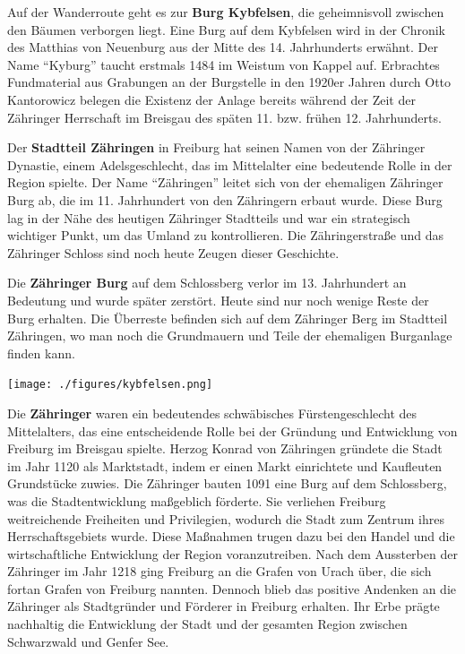 \documentclass[landscape, a4paper]{article}
\newcommand\alert[1]{\textcolor{PrimaryColor}{\textbf{#1}}}
\begin{document}
\begin{minipage}[t]{0.32\textwidth}
	\setlength{\parskip}{0.25cm}
	\vspace{0cm}

	Auf der Wanderroute geht es zur \alert{Burg Kybfelsen}, die geheimnisvoll zwischen den Bäumen verborgen liegt. Eine Burg auf dem Kybfelsen wird in der Chronik des Matthias von Neuenburg aus der Mitte des 14. Jahrhunderts erwähnt. Der Name \enquote{Kyburg} taucht erstmals 1484 im Weistum von Kappel auf. Erbrachtes Fundmaterial aus Grabungen an der Burgstelle in den 1920er Jahren durch Otto Kantorowicz belegen die Existenz der Anlage bereits während der Zeit der Zähringer Herrschaft im Breisgau des späten 11. bzw. frühen 12. Jahrhunderts. %

	Der \alert{Stadtteil Zähringen} in Freiburg hat seinen Namen von der Zähringer Dynastie, einem Adelsgeschlecht, das im Mittelalter eine bedeutende Rolle in der Region spielte. Der Name \enquote{Zähringen} leitet sich von der ehemaligen Zähringer Burg ab, die im 11. Jahrhundert von den Zähringern erbaut wurde. Diese Burg lag in der Nähe des heutigen Zähringer Stadtteils und war ein strategisch wichtiger Punkt, um das Umland zu kontrollieren. Die Zähringerstraße und das Zähringer Schloss sind noch heute Zeugen dieser Geschichte.

	Die \alert{Zähringer Burg} auf dem Schlossberg verlor im 13. Jahrhundert an Bedeutung und wurde später zerstört. Heute sind nur noch wenige Reste der Burg erhalten. Die Überreste befinden sich auf dem Zähringer Berg im Stadtteil Zähringen, wo man noch die Grundmauern und Teile der ehemaligen Burganlage finden kann.

	\texttt{[image: ./figures/kybfelsen.png]}
	\setlength{\parskip}{0.25cm}
	\vspace{0.15cm}

	Die \alert{Zähringer} waren ein bedeutendes schwäbisches Fürstengeschlecht des Mittelalters, das eine entscheidende Rolle bei der Gründung und Entwicklung von Freiburg im Breisgau spielte. Herzog Konrad von Zähringen gründete die Stadt im Jahr 1120 als Marktstadt, indem er einen Markt einrichtete und Kaufleuten Grundstücke zuwies. Die Zähringer bauten 1091 eine Burg auf dem Schlossberg, was die Stadtentwicklung maßgeblich förderte. Sie verliehen Freiburg weitreichende Freiheiten und Privilegien, wodurch die Stadt zum Zentrum ihres Herrschaftsgebiets wurde. Diese Maßnahmen trugen dazu bei den Handel und die wirtschaftliche Entwicklung der Region voranzutreiben. Nach dem Aussterben der Zähringer im Jahr 1218 ging Freiburg an die Grafen von Urach über, die sich fortan Grafen von Freiburg nannten. Dennoch blieb das positive Andenken an die Zähringer als Stadtgründer und Förderer in Freiburg erhalten. Ihr Erbe prägte nachhaltig die Entwicklung der Stadt und der gesamten Region zwischen Schwarzwald und Genfer See.


\end{minipage}
\end{document}
